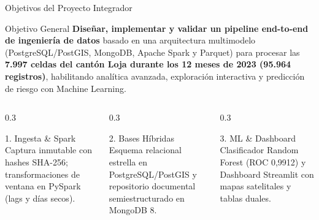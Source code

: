 \documentclass[aspectratio=169,11pt]{beamer}
\newcommand{\seccionactual}{Sustentaci\'on Final}
\begin{document}
\renewcommand{\seccionactual}{Objetivos}
\begin{frame}{Objetivos del Proyecto Integrador}
  \begin{block}{Objetivo General}
    \textbf{Dise\~nar, implementar y validar un pipeline end-to-end de ingenier\'ia de datos} basado en una arquitectura multimodelo (PostgreSQL/PostGIS, MongoDB, Apache Spark y Parquet) para procesar las \textbf{7.997 celdas del cant\'on Loja durante los 12 meses de 2023 (95.964 registros)}, habilitando anal\'itica avanzada, exploraci\'on interactiva y predicci\'on de riesgo con Machine Learning.
  \end{block}
  \vspace{0.2cm}
  \begin{columns}[t]
    \begin{column}{0.3\textwidth}
      \begin{exampleblock}{1. Ingesta \& Spark}
        \scriptsize Captura inmutable con hashes SHA-256; transformaciones de ventana en PySpark (lags y d\'ias secos).
      \end{exampleblock}
    \end{column}
    \begin{column}{0.3\textwidth}
      \begin{exampleblock}{2. Bases H\'ibridas}
        \scriptsize Esquema relacional estrella en PostgreSQL/PostGIS y repositorio documental semiestructurado en MongoDB 8.
      \end{exampleblock}
    \end{column}
    \begin{column}{0.3\textwidth}
      \begin{exampleblock}{3. ML \& Dashboard}
        \scriptsize Clasificador Random Forest (ROC 0,9912) y Dashboard Streamlit con mapas satelitales y tablas duales.
      \end{exampleblock}
    \end{column}
  \end{columns}
\end{frame}
\end{document}
